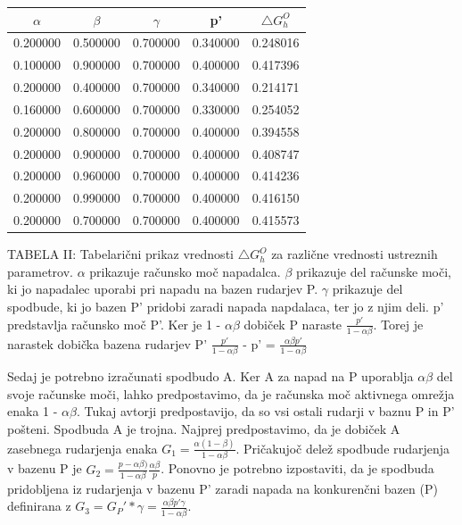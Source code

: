 \documentclass[12pt]{article}
\begin{document}
\begin{center}
  \begin{tabular}{ | c | c | c | c | c | }
    \hline
    $\alpha$ & $\beta$ & $\gamma$ & p' & $\bigtriangleup G_h^O $  \\ \hline
    0.200000 & 0.500000 & 0.700000 & 0.340000 & 0.248016 \\ \hline
    0.100000 & 0.900000 & 0.700000 & 0.400000 & 0.417396 \\ \hline
    0.200000 & 0.400000 & 0.700000 & 0.340000 & 0.214171 \\ \hline
    0.160000 & 0.600000 & 0.700000 & 0.330000 & 0.254052 \\ \hline
    0.200000 & 0.800000 & 0.700000 & 0.400000 & 0.394558 \\ \hline
    0.200000 & 0.900000 & 0.700000 & 0.400000 & 0.408747 \\ \hline
    0.200000 & 0.960000 & 0.700000 & 0.400000 & 0.414236 \\ \hline
    0.200000 & 0.990000 & 0.700000 & 0.400000 & 0.416150 \\ \hline
    0.200000 & 0.700000 & 0.700000 & 0.400000 & 0.415573 \\ \hline
  \end{tabular}
\end{center}
TABELA II: Tabelarični prikaz vrednosti $\bigtriangleup G_h^O $ za različne vrednosti ustreznih parametrov. $\alpha$ prikazuje računsko moč napadalca. $\beta$ prikazuje del računske moči, ki jo napadalec uporabi pri napadu na bazen rudarjev P. $\gamma$ prikazuje del spodbude, ki jo bazen P' pridobi zaradi napada napdalaca, ter jo z njim deli. p' predstavlja računsko moč P'.
\newline
\newline
Ker je 1 - $\alpha\beta$ dobiček P naraste $\frac{p'}{ 1 - \alpha\beta}$.  Torej je narastek dobička bazena rudarjev P'  $\frac{p'}{1 - \alpha\beta}$ - p' = $\frac{\alpha\beta p'}{1 - \alpha\beta}$
\newline

Sedaj je potrebno izračunati spodbudo A. Ker A za napad na P uporablja $\alpha\beta$ del svoje računske moči, lahko predpostavimo, da je računska moč aktivnega omrežja enaka 1 - $\alpha\beta$. Tukaj avtorji predpostavijo\cite{originalarticle}, da so vsi ostali rudarji v baznu P in P' pošteni. Spodbuda A je trojna. Najprej predpostavimo, da je dobiček A zasebnega rudarjenja enaka $ G_1 = \frac{\alpha(1 - \beta)}{ 1 - \alpha\beta}$. Pričakujoč delež spodbude rudarjenja v bazenu P je $ G_2 = \frac{p - \alpha\beta)}{ 1 - \alpha\beta} \frac{\alpha\beta}{p}$. Ponovno je potrebno izpostaviti, da je spodbuda pridobljena iz rudarjenja v bazenu P' zaradi napada na konkurenčni bazen (P) definirana z $ G_3 = G_P' * \gamma = \frac{\alpha\beta p' \gamma}{1 - \alpha\beta} $. 
\end{document}
